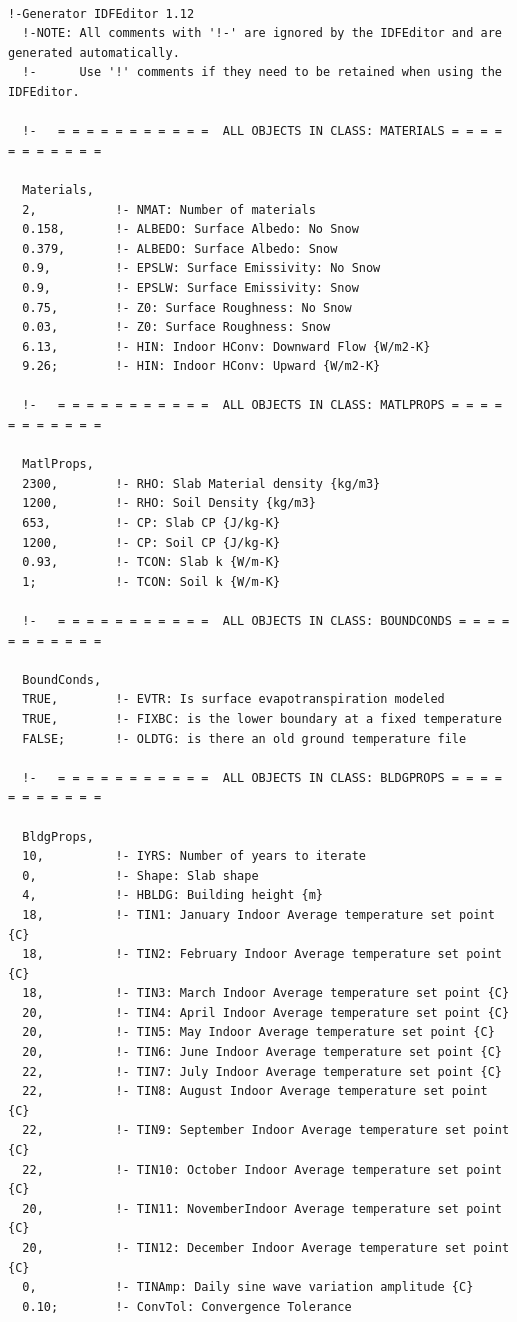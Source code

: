 \begin{lstlisting}

!-Generator IDFEditor 1.12
  !-NOTE: All comments with '!-' are ignored by the IDFEditor and are generated automatically.
  !-      Use '!' comments if they need to be retained when using the IDFEditor.

  !-   = = = = = = = = = = =  ALL OBJECTS IN CLASS: MATERIALS = = = = = = = = = = =

  Materials,
  2,           !- NMAT: Number of materials
  0.158,       !- ALBEDO: Surface Albedo: No Snow
  0.379,       !- ALBEDO: Surface Albedo: Snow
  0.9,         !- EPSLW: Surface Emissivity: No Snow
  0.9,         !- EPSLW: Surface Emissivity: Snow
  0.75,        !- Z0: Surface Roughness: No Snow
  0.03,        !- Z0: Surface Roughness: Snow
  6.13,        !- HIN: Indoor HConv: Downward Flow {W/m2-K}
  9.26;        !- HIN: Indoor HConv: Upward {W/m2-K}

  !-   = = = = = = = = = = =  ALL OBJECTS IN CLASS: MATLPROPS = = = = = = = = = = =

  MatlProps,
  2300,        !- RHO: Slab Material density {kg/m3}
  1200,        !- RHO: Soil Density {kg/m3}
  653,         !- CP: Slab CP {J/kg-K}
  1200,        !- CP: Soil CP {J/kg-K}
  0.93,        !- TCON: Slab k {W/m-K}
  1;           !- TCON: Soil k {W/m-K}

  !-   = = = = = = = = = = =  ALL OBJECTS IN CLASS: BOUNDCONDS = = = = = = = = = = =

  BoundConds,
  TRUE,        !- EVTR: Is surface evapotranspiration modeled
  TRUE,        !- FIXBC: is the lower boundary at a fixed temperature
  FALSE;       !- OLDTG: is there an old ground temperature file

  !-   = = = = = = = = = = =  ALL OBJECTS IN CLASS: BLDGPROPS = = = = = = = = = = =

  BldgProps,
  10,          !- IYRS: Number of years to iterate
  0,           !- Shape: Slab shape
  4,           !- HBLDG: Building height {m}
  18,          !- TIN1: January Indoor Average temperature set point {C}
  18,          !- TIN2: February Indoor Average temperature set point {C}
  18,          !- TIN3: March Indoor Average temperature set point {C}
  20,          !- TIN4: April Indoor Average temperature set point {C}
  20,          !- TIN5: May Indoor Average temperature set point {C}
  20,          !- TIN6: June Indoor Average temperature set point {C}
  22,          !- TIN7: July Indoor Average temperature set point {C}
  22,          !- TIN8: August Indoor Average temperature set point {C}
  22,          !- TIN9: September Indoor Average temperature set point {C}
  22,          !- TIN10: October Indoor Average temperature set point {C}
  20,          !- TIN11: NovemberIndoor Average temperature set point {C}
  20,          !- TIN12: December Indoor Average temperature set point {C}
  0,           !- TINAmp: Daily sine wave variation amplitude {C}
  0.10;        !- ConvTol: Convergence Tolerance


\end{lstlisting}
